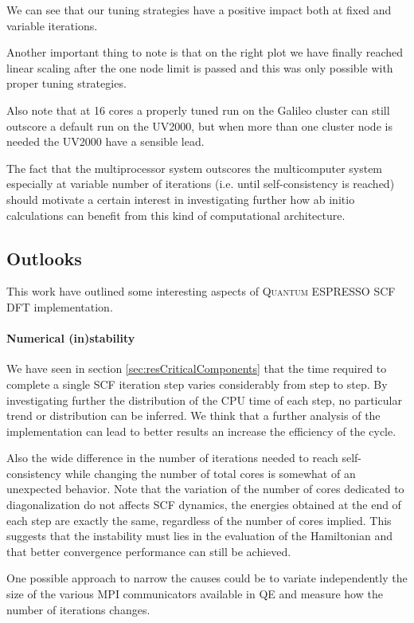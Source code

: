\documentclass[a4paper,12pt]{article}
\newcommand\QE{\textsc{Quantum} ESPRESSO }
\begin{document}
We can see that our tuning strategies have a positive impact both at fixed and variable iterations.

Another important thing to note is that on the right plot we have finally reached linear scaling after the one node limit is passed and this was only possible with proper tuning strategies.

Also note that at 16 cores a properly tuned run on the Galileo cluster can still outscore a default run on the UV2000, but when more than one cluster node is needed the UV2000 have a sensible lead.

The fact that the multiprocessor system outscores the multicomputer system especially at variable number of iterations (i.e. until self-consistency is reached) should motivate a certain interest in investigating further how ab initio calculations can benefit from this kind of computational architecture.


\newpage
\subsection{Outlooks}

This work have outlined some interesting aspects of \QE SCF DFT implementation.

\paragraph{Numerical (in)stability} We have seen in section \ref{sec:resCriticalComponents} that the time required to complete a single SCF iteration step varies considerably from step to step.
By investigating further the distribution of the CPU time of each step, no particular trend or distribution can be inferred.
We think that a further analysis of the implementation can lead to better results an increase the efficiency of the cycle.

Also the wide difference in the number of iterations needed to reach self-consistency while changing the number of total cores is somewhat of an unexpected behavior. 
Note that the variation of the number of cores dedicated to diagonalization do not affects SCF dynamics, the energies obtained at the end of each step are exactly the same, regardless of the number of cores implied.
This suggests that the instability must lies in the evaluation of the Hamiltonian and that better convergence performance can still be achieved.

One possible approach to narrow the causes could be to variate independently the size of the various MPI communicators available in QE and measure how the number of iterations changes.
\end{document}
